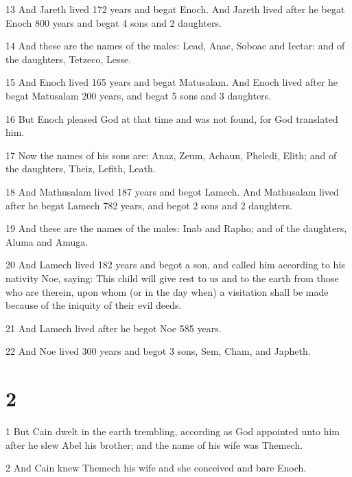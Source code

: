 \par 13 And Jareth lived 172 years and begat Enoch. And Jareth lived after he begat Enoch 800 years and begat 4 sons and 2 daughters. 

\par 14 And these are the names of the males: Lead, Anac, Soboac and Iectar: and of the daughters, Tetzeco, Lesse.

\par 15 And Enoch lived 165 years and begat Matusalam. And Enoch lived after he begat Matusalam 200 years, and begat 5 sons and 3 daughters.

\par 16 But Enoch pleased God at that time and was not found, for God translated him.

\par 17 Now the names of his sons are: Anaz, Zeum, Achaun, Pheledi, Elith; and of the daughters, Theiz, Lefith, Leath.

\par 18 And Mathusalam lived 187 years and begot Lamech. And Mathusalam lived after he begat Lamech 782 years, and begot 2 sons and 2 daughters.

\par 19 And these are the names of the males: Inab and Rapho; and of the daughters, Aluma and Amuga.

\par 20 And Lamech lived 182 years and begot a son, and called him according to his nativity Noe, saying: This child will give rest to us and to the earth from those who are therein, upon whom (or in the day when) a visitation shall be made because of the iniquity of their evil deeds.

\par 21 And Lamech lived after he begot Noe 585 years.

\par 22 And Noe lived 300 years and begot 3 sons, Sem, Cham, and Japheth.

\chapter{2}

\par 1 But Cain dwelt in the earth trembling, according as God appointed unto him after he slew Abel his brother; and the name of his wife was Themech.

\par 2 And Cain knew Themech his wife and she conceived and bare Enoch.

